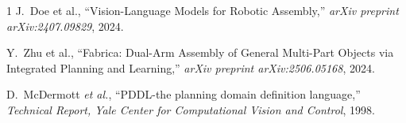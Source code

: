 \documentclass[journal]{IEEEtran}
\begin{document}
\begin{thebibliography}{1}
     J.~Doe et al., ``Vision-Language Models for
      Robotic Assembly,'' \emph{arXiv preprint arXiv:2407.09829}, 2024.

     Y.~Zhu et al., ``Fabrica: Dual-Arm Assembly of
      General Multi-Part Objects via Integrated Planning and Learning,'' \emph{arXiv
      preprint arXiv:2506.05168}, 2024.


     D.~McDermott \emph{et al.}, ``PDDL-the planning
      domain definition language,'' \emph{Technical Report, Yale Center for Computational
      Vision and Control}, 1998.
  \end{thebibliography}
\end{document}
